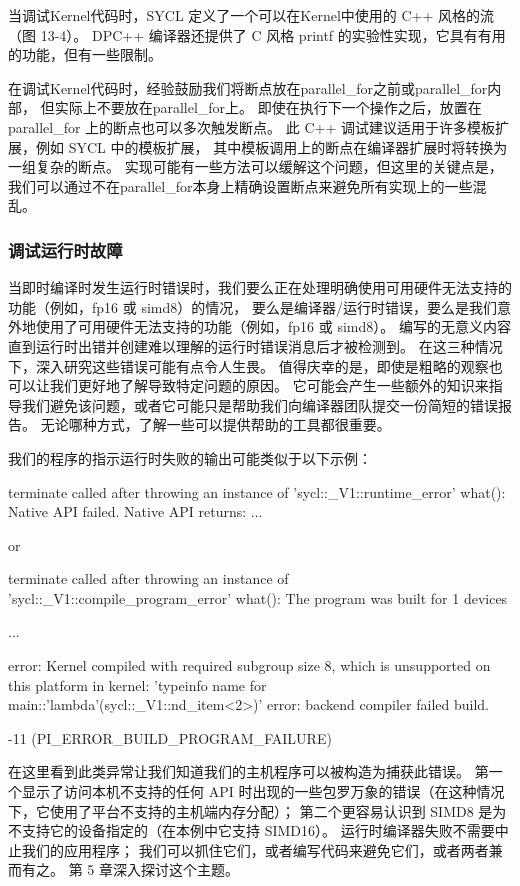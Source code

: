 当调试Kernel代码时，SYCL 定义了一个可以在Kernel中使用的 C++ 风格的流（图 13-4）。 
DPC++ 编译器还提供了 C 风格 printf 的实验性实现，它具有有用的功能，但有一些限制。

在调试Kernel代码时，经验鼓励我们将断点放在parallel\_for之前或parallel\_for内部，
但实际上不要放在parallel\_for上。 即使在执行下一个操作之后，放置在parallel\_for 上的断点也可以多次触发断点。 
此 C++ 调试建议适用于许多模板扩展，例如 SYCL 中的模板扩展，
其中模板调用上的断点在编译器扩展时将转换为一组复杂的断点。 
实现可能有一些方法可以缓解这个问题，但这里的关键点是，
我们可以通过不在parallel\_for本身上精确设置断点来避免所有实现上的一些混乱。

\subsubsection{调试运行时故障}
当即时编译时发生运行时错误时，我们要么正在处理明确使用可用硬件无法支持的功能（例如，fp16 或 simd8）的情况，
要么是编译器/运行时错误，要么是我们意外地使用了可用硬件无法支持的功能（例如，fp16 或 simd8）。 
编写的无意义内容直到运行时出错并创建难以理解的运行时错误消息后才被检测到。 
在这三种情况下，深入研究这些错误可能有点令人生畏。 
值得庆幸的是，即使是粗略的观察也可以让我们更好地了解导致特定问题的原因。 
它可能会产生一些额外的知识来指导我们避免该问题，或者它可能只是帮助我们向编译器团队提交一份简短的错误报告。 
无论哪种方式，了解一些可以提供帮助的工具都很重要。

我们的程序的指示运行时失败的输出可能类似于以下示例：

terminate called after throwing an instance of 'sycl::\_V1::runtime\_error' what(): Native API failed. Native API returns: ...

or

terminate called after throwing an instance of 'sycl::\_V1::compile\_program\_error' what(): The program was built for 1 devices 

...

error: Kernel compiled with required subgroup size 8, which is unsupported on this platform in kernel: 'typeinfo name for main::'lambda'(sycl::\_V1::nd\_item<2>)' error: backend compiler failed build.

-11 (PI\_ERROR\_BUILD\_PROGRAM\_FAILURE)

在这里看到此类异常让我们知道我们的主机程序可以被构造为捕获此错误。 
第一个显示了访问本机不支持的任何 API 时出现的一些包罗万象的错误（在这种情况下，它使用了平台不支持的主机端内存分配）； 
第二个更容易认识到 SIMD8 是为不支持它的设备指定的（在本例中它支持 SIMD16）。 
运行时编译器失败不需要中止我们的应用程序； 我们可以抓住它们，或者编写代码来避免它们，或者两者兼而有之。 
第 5 章深入探讨这个主题。


